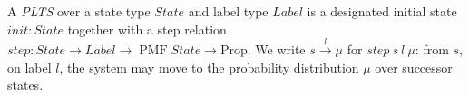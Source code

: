\begin{definition}
  \label{def:system}
  \leanok
  A \emph{PLTS} over a state type $State$ and label type $Label$ is a designated initial state $init : State$ together with a step relation $step : State \to Label \to \operatorname{PMF} State \to \mathrm{Prop}$. We write $s \xrightarrow{l} \mu$ for $step\ s\ l\ \mu$: from $s$, on label $l$, the system may move to the probability distribution $\mu$ over successor states.
\end{definition}
